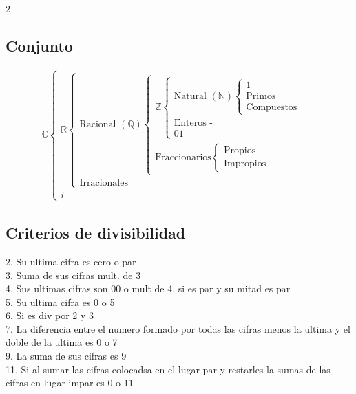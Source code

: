 \begin{multicols}{2}
\subsection{Conjunto}
\[
\begin{array}{l}
  \mathbb{C} \left\{
    \begin{array}{l}
      \mathbb{R} \left\{
        \begin{array}{l}
          \text{Racional } (\mathbb{Q}) \left\{
            \begin{array}{l}
               \mathbb{Z} \left\{
                \begin{array}{l}
                  \text{Natural } (\mathbb{N}) \left\{
                    \begin{array}{l}
                      1\\
                      \text{Primos}\\
                      \text{Compuestos}
                    \end{array}
                  \right. \\[4pt]
                  \text{Enteros -}\\
                  \text{01}
                \end{array}
              \right. \\[4pt]
              \text{Fraccionarios} \left\{
                \begin{array}{l}
                  \text{Propios}\\
                  \text{Impropios}
                \end{array}
              \right.
            \end{array}
          \right. \\[4pt]
          \text{Irracionales}
        \end{array}
      \right. \\[4pt]
      i
    \end{array}
  \right.
\end{array}
\]

              \subsection{Criterios de divisibilidad}
              2. Su ultima cifra es cero o par\\
              3. Suma de sus cifras mult. de 3 \\
              4. Sus ultimas cifras son 00 o mult de 4, si es par y su mitad es par\\
              5. Su ultima cifra es 0 o 5\\
              6. Si es div por 2 y 3\\
              7. La diferencia entre el numero formado por todas las cifras menos la ultima y el doble de la ultima es 0 o 7\\
              9. La suma de sus cifras es 9\\
              11. Si al sumar las cifras colocadsa en el lugar par y restarles la sumas de las cifras en lugar impar es 0 o 11
              \columnbreak

\end{multicols}
